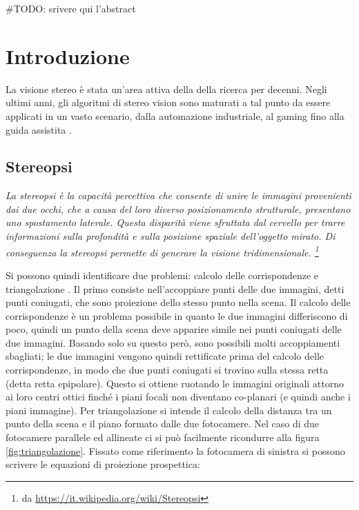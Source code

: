 \documentclass[12pt]{report}
\newcommand{\nullpage}{\newpage\null\thispagestyle{empty}}
\begin{document}
	\#TODO: srivere qui l'abstract
	

	\nullpage						%
	\tableofcontents				%
	\nullpage						%

	\renewcommand{\thepage}{\arabic{page}} %
	\setcounter{page}{1}                   %


	\chapter{Introduzione}
	\label{sec:introduzione}
	\pagestyle{fancy}
	
		La visione stereo è stata un'area attiva della della ricerca per decenni. Negli ultimi anni, gli algoritmi di stereo vision sono maturati a tal punto da essere applicati in un vasto scenario, dalla automazione industriale, al gaming fino alla guida assistita \cite{mercedes}.
	
		\section{Stereopsi}
		\label{sec:Stereopsi}
			\textit{
			La stereopsi è la capacità percettiva che consente di unire le immagini provenienti dai due occhi, che a causa del loro diverso posizionamento strutturale, presentano uno spostamento laterale. Questa disparità viene sfruttata dal cervello per trarre informazioni sulla profondità e sulla posizione spaziale dell'oggetto mirato. Di conseguenza la stereopsi permette di generare la visione tridimensionale. \footnote{da \url{https://it.wikipedia.org/wiki/Stereopsi}} \newline}
			
			Si possono quindi identificare due problemi: calcolo delle corrispondenze e triangolazione \cite{fusiello}.\newline
			Il primo consiste nell'accoppiare punti delle due immagini, detti punti coniugati, che sono proiezione dello stesso punto nella scena. Il calcolo delle corrispondenze è un problema possibile in quanto le due immagini differiscono di poco, quindi un punto della scena deve apparire simile nei punti coniugati delle due immagini. Basando solo su questo però, sono possibili molti accoppiamenti sbagliati; le due immagini vengono quindi rettificate prima del calcolo delle corrispondenze, in modo che due punti coniugati si trovino sulla stessa retta (detta retta epipolare). Questo si ottiene ruotando le immagini originali attorno ai loro centri ottici finché i piani 
			focali non diventano co-planari (e quindi anche i piani immagine).\newline
			Per triangolazione si intende il calcolo della distanza tra un punto della scena e il piano formato dalle due fotocamere. Nel caso di due fotocamere parallele ed allineate ci si può facilmente ricondurre alla figura \ref{fig:triangolazione}.\newline
			Fissato come riferimento la fotocamera di sinistra si possono scrivere le equazioni di proiezione prospettica:
			
\end{document}
